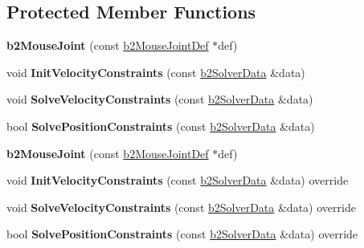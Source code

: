\subsection*{Protected Member Functions}
\begin{DoxyCompactItemize}
\item 
\mbox{\label{classb2MouseJoint_ad147d7989d884952c3389f7e5e3acf68}} 
{\bfseries b2\+Mouse\+Joint} (const \hyperlink{structb2MouseJointDef}{b2\+Mouse\+Joint\+Def} $\ast$def)
\item 
\mbox{\label{classb2MouseJoint_a81fbb58a52c3cea00fb25817d04d16e6}} 
void {\bfseries Init\+Velocity\+Constraints} (const \hyperlink{structb2SolverData}{b2\+Solver\+Data} \&data)
\item 
\mbox{\label{classb2MouseJoint_a94efc95b4ab292d1cc193c6edbb362a2}} 
void {\bfseries Solve\+Velocity\+Constraints} (const \hyperlink{structb2SolverData}{b2\+Solver\+Data} \&data)
\item 
\mbox{\label{classb2MouseJoint_a990ed3aaa5092ab92180b8ec3c3df342}} 
bool {\bfseries Solve\+Position\+Constraints} (const \hyperlink{structb2SolverData}{b2\+Solver\+Data} \&data)
\item 
\mbox{\label{classb2MouseJoint_ad147d7989d884952c3389f7e5e3acf68}} 
{\bfseries b2\+Mouse\+Joint} (const \hyperlink{structb2MouseJointDef}{b2\+Mouse\+Joint\+Def} $\ast$def)
\item 
\mbox{\label{classb2MouseJoint_a02c342a98cfa5687de2bd3dba7c700b1}} 
void {\bfseries Init\+Velocity\+Constraints} (const \hyperlink{structb2SolverData}{b2\+Solver\+Data} \&data) override
\item 
\mbox{\label{classb2MouseJoint_a9256297320a1a67e9dc49b70f4798dd8}} 
void {\bfseries Solve\+Velocity\+Constraints} (const \hyperlink{structb2SolverData}{b2\+Solver\+Data} \&data) override
\item 
\mbox{\label{classb2MouseJoint_a13f9ec996eff59c15e6330a8c3f5ba9f}} 
bool {\bfseries Solve\+Position\+Constraints} (const \hyperlink{structb2SolverData}{b2\+Solver\+Data} \&data) override
\end{DoxyCompactItemize}
